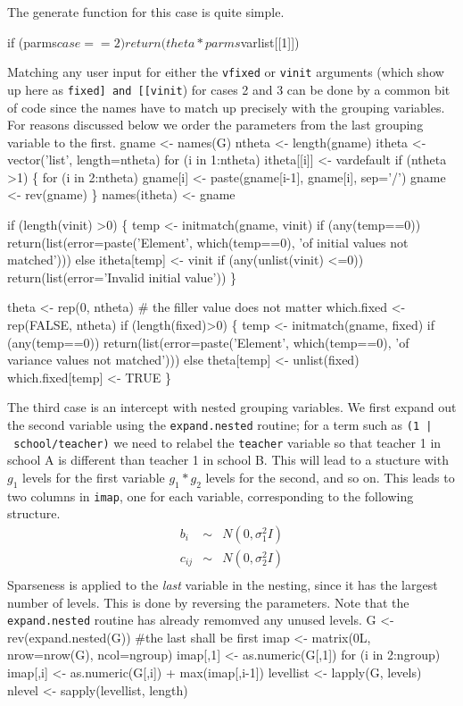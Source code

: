 \documentclass{article}
\begin{document}
The generate function for this case is quite simple.
\nwenddocs{}\endmoddef

if (parms$case==2) return(theta*parms$varlist[[1]])
\nwendcode{}\nwdocspar

Matching any user input for either
the {\tt{}vfixed} or {\tt{}vinit} arguments (which show up here as
{\tt{}fixed]\ and\ [[vinit}) for cases 2 and 3 can be
done by a common bit of code since the names
have to match up precisely with the grouping variables.
For reasons discussed below we order the parameters from the last grouping
variable to the first.
\nwenddocs{}\endmoddef
gname <-  names(G)
ntheta <- length(gname)
itheta <- vector('list', length=ntheta)
for (i in 1:ntheta) itheta[[i]] <- vardefault
if (ntheta >1) \{
    for (i in 2:ntheta) gname[i] <- paste(gname[i-1], gname[i], sep='/')
    gname <- rev(gname) 
    \}
names(itheta) <- gname

if (length(vinit) >0) \{
    temp <- initmatch(gname, vinit)
    if (any(temp==0))
        return(list(error=paste('Element', which(temp==0),
                                'of initial values not matched')))
    else itheta[temp] <- vinit
    if (any(unlist(vinit) <=0))
        return(list(error='Invalid initial value'))
    \}

theta <- rep(0, ntheta)   # the filler value does not matter
which.fixed <- rep(FALSE, ntheta)
if (length(fixed)>0) \{
    temp <- initmatch(gname, fixed)
    if (any(temp==0))
        return(list(error=paste('Element', which(temp==0),
                                 'of variance values not matched')))
    else theta[temp] <- unlist(fixed)
    which.fixed[temp] <- TRUE
    \}
\nwendcode{}    

The third case is an intercept with nested grouping variables.
We first expand out the second variable using the {\tt{}expand.nested}
routine; for a term such as
{\tt{}(1\ |\ school/teacher)} we need to relabel the {\tt{}teacher} variable
so that teacher 1 in school A is different than teacher 1 in school
B.
This will lead to a stucture with $g_1$ levels for the first variable
$g_1*g_2$ levels for the second, and so on. 
This leads to two columns in {\tt{}imap}, one
for each variable, corresponding to the following structure.
\begin{eqnarray*}
 b_i &\sim & N(0, \sigma_1^2 I) \\
 c_{ij} &\sim & N(0, \sigma_2^2 I)\\
\end{eqnarray*}
Sparseness is applied to the \emph{last} variable in the nesting, since
it has the largest number of levels.
This is done by reversing the parameters.
Note that the {\tt{}expand.nested} routine
has already remomved any unused levels.
\nwenddocs{}\endmoddef
G <- rev(expand.nested(G))  #the last shall be first
imap <- matrix(0L, nrow=nrow(G), ncol=ngroup)
imap[,1] <- as.numeric(G[,1])
for (i in 2:ngroup) 
    imap[,i] <- as.numeric(G[,i]) + max(imap[,i-1])
levellist <- lapply(G, levels)
nlevel <- sapply(levellist, length)
\end{document}
